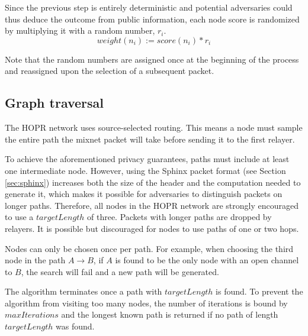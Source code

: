 Since the previous step is entirely deterministic and potential adversaries could thus deduce the outcome from public information, each node score is randomized by multiplying it with a random number, $r_i$.
$$weight(n_i) := score(n_i) * r_i$$

Note that the random numbers are assigned once at the beginning of the process and reassigned upon the selection of a subsequent packet.

\subsection{Graph traversal}
\label{sec:path-selection:graph-traversal}

The HOPR network uses source-selected routing. This means a node must sample the entire path the mixnet packet will take before sending it to the first relayer.

To achieve the aforementioned privacy guarantees, paths must include at least one intermediate node. However, using the Sphinx packet format (see Section \ref{sec:sphinx}) increases both the size of the header and the computation needed to generate it, which makes it possible for adversaries to distinguish packets on longer paths. Therefore, all nodes in the HOPR network are strongly encouraged to use a $targetLength$ of three. Packets with longer paths are dropped by relayers. It is possible but discouraged for nodes to use paths of one or two hops.

Nodes can only be chosen once per path. For example, when choosing the third node in the path $A\rightarrow B$, if $A$ is found to be the only node with an open channel to $B$, the search will fail and a new path will be generated.

The algorithm terminates once a path with $targetLength$ is found. To prevent the algorithm from visiting too many nodes, the number of iterations is bound by $maxIterations$ and the longest known path is returned if no path of length $targetLength$ was found.

